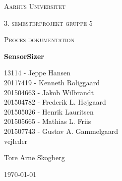 \thispagestyle{empty}
	{\centering
	{\scshape\LARGE Aarhus Universitet \par}
	\vspace{1cm}
	{\scshape\Large 3. semesterprojekt gruppe 5\par}
	{\scshape\Large Proces dokumentation\par}
	\vspace{1.5cm}
	{\huge\bfseries SensorSizer\par}
	\vspace{2cm}
	{\Large
	13114 - Jeppe Hansen\\ 
	20117419 - Kenneth Roliggaard\\
	201504663 - Jakob Wilbrandt\\ 
	201504782 - Frederik L. Højgaard\\ 
	201505026 - Henrik Lauritsen\\ 
	201505665 - Mathias L. Friis\\ 
	201507743 - Gustav A. Gammelgaard\\}
	\vfill
	vejleder\par
	Tore Arne Skogberg

	\vfill

	{\large \today\par}
\par}

